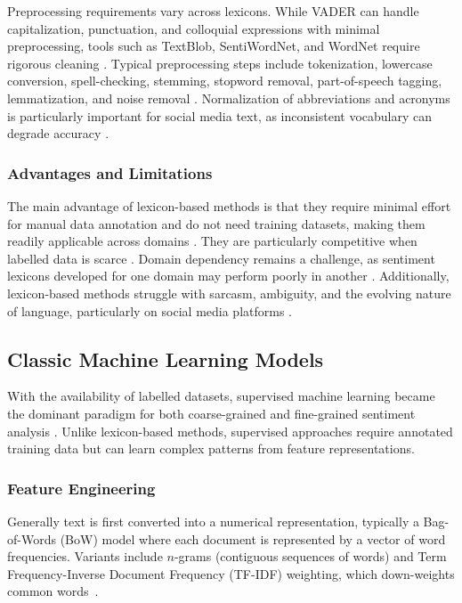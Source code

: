 \documentclass[a4paper,twoside,12pt]{book}
\begin{document}
Preprocessing requirements vary across lexicons. While VADER can handle capitalization, punctuation, and colloquial expressions with minimal preprocessing, tools such as TextBlob, SentiWordNet, and WordNet require rigorous cleaning \cite{nursal2025battle}. Typical preprocessing steps include tokenization, lowercase conversion, spell-checking, stemming, stopword removal, part-of-speech tagging, lemmatization, and noise removal \cite{nursal2025battle}. Normalization of abbreviations and acronyms is particularly important for social media text, as inconsistent vocabulary can degrade accuracy \cite{nursal2025battle}.

\subsubsection{Advantages and Limitations}

The main advantage of lexicon-based methods is that they require minimal effort for manual data annotation and do not need training datasets, making them readily applicable across domains \cite{nursal2025battle}. They are particularly competitive when labelled data is scarce \cite{azzeddine2018sentiment}. Domain dependency remains a challenge, as sentiment lexicons developed for one domain may perform poorly in another \cite{behdenna2018document}. Additionally, lexicon-based methods struggle with sarcasm, ambiguity, and the evolving nature of language, particularly on social media platforms \cite{nursal2025battle}.

\subsection{Classic Machine Learning Models}

With the availability of labelled datasets, supervised machine learning became the dominant paradigm for both coarse-grained and fine-grained sentiment analysis \cite{azzeddine2018sentiment}. Unlike lexicon-based methods, supervised approaches require annotated training data but can learn complex patterns from feature representations.

\subsubsection{Feature Engineering}

Generally text is first converted into a numerical representation, typically a Bag-of-Words (BoW) model where each document is represented by a vector of word frequencies. Variants include $n$-grams (contiguous sequences of words) and Term Frequency-Inverse Document Frequency (TF-IDF) weighting, which down-weights common words~\cite{behdenna2018document}.
\end{document}
